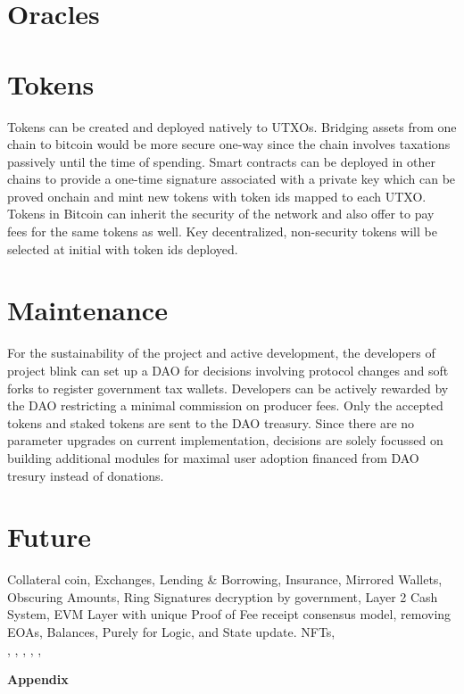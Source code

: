 \documentclass[a4paper,10pt]{article}
\begin{document}
\section{Oracles}

\section{Tokens}
Tokens can be created and deployed natively to UTXOs. Bridging assets from one chain to bitcoin would be more secure one-way since the chain involves taxations passively until the time of spending. Smart contracts can be deployed in other chains to provide a one-time signature associated with a private key which can be proved onchain and mint new tokens with token ids mapped to each UTXO. Tokens in Bitcoin can inherit the security of the network and also offer to pay fees for the same tokens as well. Key decentralized, non-security tokens will be selected at initial with token ids deployed. 
 
\section{Maintenance}
For the sustainability of the project and active development, the developers of project blink can set up a DAO for decisions involving protocol changes and soft forks to register government tax wallets. Developers can be actively rewarded by the DAO restricting a minimal commission on producer fees. Only the accepted tokens and staked tokens are sent to the DAO treasury. Since there are no parameter upgrades on current implementation, decisions are solely focussed on building additional modules for maximal user adoption financed from DAO tresury instead of donations.

\section{Future}

Collateral coin, Exchanges, Lending \& Borrowing, Insurance, Mirrored Wallets, Obscuring Amounts, Ring Signatures decryption by government, Layer 2 Cash System, EVM Layer with unique Proof of Fee receipt consensus model, removing EOAs, Balances, Purely for Logic, and State update. NFTs,\\

\cite{nakamoto2008bitcoin}, \cite{poon2016bitcoin} , \cite{yakovenko2018solana}, \cite{wood2014ethereum}, \cite{rai2020}, \cite{Stateful}


\appendix
\noindent \Large \textbf{Appendix}
\end{document}
